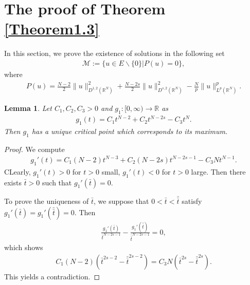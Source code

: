 \documentclass[12pt,a4paper,reqno]{amsart}
\numberwithin{equation}{section}
\newtheorem{lemma}{Lemma}[section]
\begin{document}
\section{The proof of Theorem \ref{Theorem1.3}}
In this section, we prove the existence of solutions in the following set
\begin{equation*}
\begin{aligned}
\mathcal{M}:=\{u\in E\backslash\{0\}|P(u)=0\},
\end{aligned}
\end{equation*}
where
\begin{equation*}
\begin{aligned}
P(u)=\frac{N-2}{2}
\|u\|^{2}_{D^{1,2}(\mathbb{R}^{N})}
+
\frac{N-2s}{2}
\|u\|^{2}_{D^{s,2}(\mathbb{R}^{N})}
-\frac{N}{p}\|u\|_{L^{p}(\mathbb{R}^{N})}^{p}.
\end{aligned}
\end{equation*}

\begin{lemma}\label{Lemma5.1}
Let
$C_{1},C_{2},C_{3}>0$
and
$g_{1}:[0,\infty)\to \mathbb{R}$
as
\begin{equation*}
\begin{aligned}
g_{1}(t)
=
C_{1}t^{N-2}
+
C_{2}t^{N-2s}
-
C_{3}t^{N}.
\end{aligned}
\end{equation*}
Then $g_{1}$ has a unique critical point which corresponds to its maximum.
\end{lemma}

\begin{proof}
We compute
\begin{equation*}
\begin{aligned}
g_{1}'(t)
=
C_{1}(N-2)t^{N-3}
+
C_{2}(N-2s)t^{N-2s-1}
-
C_{3}Nt^{N-1}.
\end{aligned}
\end{equation*}
CLearly, $g_{1}'(t)>0$ for $t>0$ small, $g_{1}'(t)<0$ for $t>0$ large.
Then there exists $\bar{t}>0$ such that  $g_{1}'(\bar{t})=0$.

To prove the uniqueness of $\bar{t}$, we suppose that
$0<\bar{t}<\bar{\bar{t}}$
satisfy
$g_{1}'(\bar{t})=g_{1}'(\bar{\bar{t}})=0$.
Then
\begin{equation*}
\begin{aligned}
\frac{g_{1}'(\bar{t})}{\bar{t}^{N-2s-1}}
-
\frac{g_{1}'(\bar{\bar{t}})}{\bar{\bar{t}}^{N-2s-1}}=0,
\end{aligned}
\end{equation*}
which shows
\begin{equation*}
\begin{aligned}
C_{1}(N-2)
(\bar{t}^{2s-2}-\bar{\bar{t}}^{2s-2})
=
C_{3}N
(\bar{t}^{2s}-\bar{\bar{t}}^{2s}).
\end{aligned}
\end{equation*}
This yields a contradiction.
\end{proof}
\end{document}
